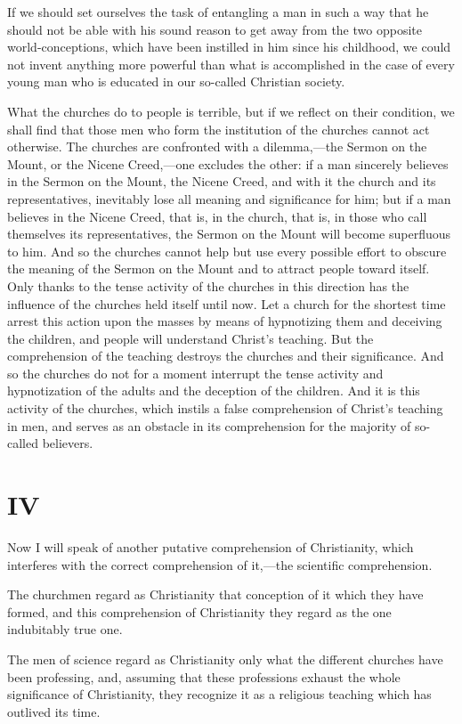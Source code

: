 \documentclass{book}
\begin{document}
If we should set ourselves the task of entangling a man in such a way that he should not be able with his sound reason to get away from the two opposite world-conceptions, which have been instilled in him since his childhood, we could not invent anything more powerful than what is accomplished in the case of every young man who is educated in our so-called Christian society.

What the churches do to people is terrible, but if we reflect on their condition, we shall find that those men who form the institution of the churches cannot act otherwise. The churches are confronted with a dilemma,—the Sermon on the Mount, or the Nicene Creed,—one excludes the other: if a man sincerely believes in the Sermon on the Mount, the Nicene Creed, and with it the church and its representatives, inevitably lose all meaning and significance for him; but if a man believes in the Nicene Creed, that is, in the church, that is, in those who call themselves its representatives, the Sermon on the Mount will become superfluous to him. And so the churches cannot help but use every possible effort to obscure the meaning of the Sermon on the Mount and to attract people toward itself. Only thanks to the tense activity of the churches in this direction has the influence of the churches held itself until now. Let a church for the shortest time arrest this action upon the masses by means of hypnotizing them and deceiving the children, and people will understand Christ’s teaching. But the comprehension of the teaching destroys the churches and their significance. And so the churches do not for a moment interrupt the tense activity and hypnotization of the adults and the deception of the children. And it is this activity of the churches, which instils a false comprehension of Christ’s teaching in men, and serves as an obstacle in its comprehension for the majority of so-called believers.

\chapter*{IV}
\label{chapter-4}
Now I will speak of another putative comprehension of Christianity, which interferes with the correct comprehension of it,—the scientific comprehension.

The churchmen regard as Christianity that conception of it which they have formed, and this comprehension of Christianity they regard as the one indubitably true one.

The men of science regard as Christianity only what the different churches have been professing, and, assuming that these professions exhaust the whole significance of Christianity, they recognize it as a religious teaching which has outlived its time.
\end{document}
